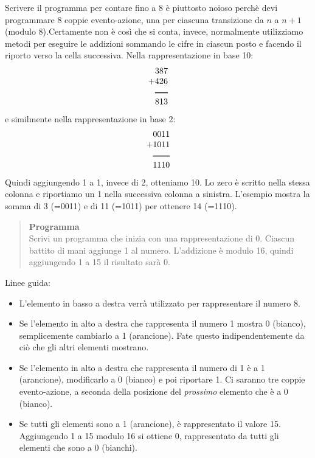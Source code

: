 Scrivere il programma per contare fino a 8 è piuttosto noioso perchè devi programmare 8 coppie evento-azione, una per ciascuna transizione da $n$ a $n+1$ (modulo 8).Certamente non è così che si conta, 
invece, normalmente utilizziamo metodi per eseguire le addizioni sommando le cifre in ciascun posto e facendo il riporto verso la cella successiva.
Nella rappresentazione in base 10:
\begin{displaymath}
\begin{array}{r}
387\\
+426\\
\rule[1pt]{1.5em}{1pt}\\
813\\
\end{array}
\end{displaymath}
e similmente nella rappresentazione in base 2:
\begin{displaymath}
\begin{array}{r}
0011\\
+1011\\
\rule[1pt]{2em}{1pt}\\
1110\\
\end{array}
\end{displaymath}
Quindi aggiungendo 1 a 1, invece di 2, otteniamo 10.
Lo zero è scritto nella stessa colonna e riportiamo un 1 nella successiva colonna a sinistra. 
L'esempio mostra la somma di  3 (=0011) e di 11 (=1011)
per ottenere 14 (=1110).

\begin{quote}
\textbf{Programma}\\
Scrivi un programma che inizia con una rappresentazione di 0.
Ciascun battito di mani aggiunge 1 al numero.
L'addizione è modulo 16, quindi aggiungendo 1 a 15 il risultato sarà 0.
\end{quote}

Linee guida:

\begin{itemize}
\item L'elemento in basso a destra verrà utilizzato per rappresentare il numero 8.
\item Se l'elemento in alto a destra che rappresenta il numero
1 mostra 0 (bianco),
semplicemente cambiarlo a 1 (arancione). Fate questo indipendentemente da ciò che gli altri
elementi mostrano.
\item Se l'elemento in alto a destra che rappresenta il numero di 1
è a 1 (arancione),
modificarlo a 0 (bianco) e poi riportare 1.
Ci saranno tre coppie evento-azione,
a seconda della posizione del \emph{prossimo} elemento che è a 0
(bianco).
\item Se tutti gli elementi sono a 1 (arancione), è rappresentato il valore 15.
Aggiungendo 1 a 15 modulo 16 si ottiene 0, rappresentato da tutti gli elementi
che sono a 0 (bianchi).
\end{itemize}


